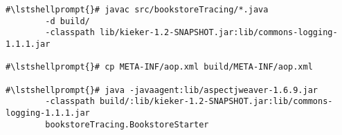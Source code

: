 \begin{lstlisting}[caption=Command to compile and run the annotated Bookstore under Linux]
#\lstshellprompt{}# javac src/bookstoreTracing/*.java
        -d build/ 
        -classpath lib/kieker-1.2-SNAPSHOT.jar:lib/commons-logging-1.1.1.jar

#\lstshellprompt{}# cp META-INF/aop.xml build/META-INF/aop.xml

#\lstshellprompt{}# java -javaagent:lib/aspectjweaver-1.6.9.jar 
        -classpath build/:lib/kieker-1.2-SNAPSHOT.jar:lib/commons-logging-1.1.1.jar
        bookstoreTracing.BookstoreStarter
\end{lstlisting}
